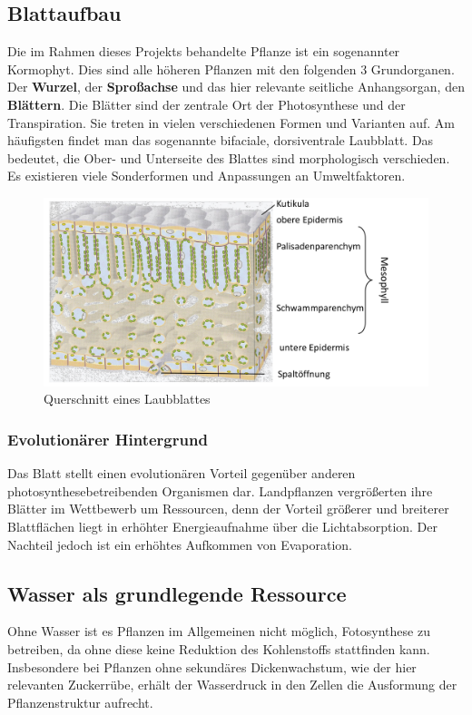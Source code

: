 \subsection{Blattaufbau}
Die im Rahmen dieses Projekts behandelte Pflanze ist ein sogenannter Kormophyt. Dies sind alle höheren Pflanzen mit den folgenden 3 Grundorganen. Der \textbf{Wurzel}, der \textbf{Sproßachse} und das hier relevante seitliche Anhangsorgan, den \textbf{Blättern}. Die Blätter sind der zentrale Ort der Photosynthese und der Transpiration. Sie treten in vielen verschiedenen Formen und Varianten auf. Am häufigsten findet man das sogenannte bifaciale, dorsiventrale Laubblatt. Das bedeutet, die Ober- und Unterseite des Blattes sind morphologisch verschieden. Es existieren viele Sonderformen und Anpassungen an Umweltfaktoren.
\begin{figure}
    \centering
    \includegraphics[width=0.7\linewidth]{Bildschirmfoto vom 2025-03-30 19-59-09.png}
    \caption{Querschnitt eines Laubblattes}
    \label{fig:enter-label}
\end{figure}
\subsubsection{Evolutionärer Hintergrund}
Das Blatt stellt einen evolutionären Vorteil gegenüber anderen photosynthesebetreibenden Organismen dar. Landpflanzen vergrößerten ihre Blätter im Wettbewerb um Ressourcen, denn der Vorteil größerer und breiterer Blattflächen liegt in erhöhter Energieaufnahme über die Lichtabsorption. Der Nachteil jedoch ist ein erhöhtes Aufkommen von Evaporation.
\subsection{Wasser als grundlegende Ressource}
Ohne Wasser ist es Pflanzen im Allgemeinen nicht möglich, Fotosynthese zu betreiben, da ohne diese keine Reduktion des Kohlenstoffs stattfinden kann. Insbesondere bei Pflanzen ohne sekundäres Dickenwachstum, wie der hier relevanten Zuckerrübe, erhält der Wasserdruck in den Zellen die Ausformung der Pflanzenstruktur aufrecht. 
